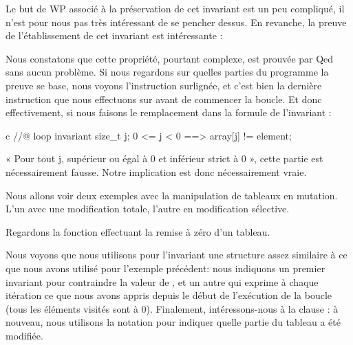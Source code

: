 Le but de WP associé à la préservation de cet invariant est un peu compliqué, il
n'est pour nous pas très intéressant de se pencher dessus. En revanche, la
preuve de l'établissement de cet invariant est intéressante :





Nous constatons que cette propriété, pourtant complexe, est prouvée par
Qed sans aucun problème. Si nous regardons sur quelles parties du programme la
preuve se base, nous voyons l'instruction  surlignée, et c'est
bien la dernière instruction que nous effectuons sur  avant de commencer
la boucle. Et donc effectivement, si nous faisons le remplacement dans la formule
de l'invariant :



\begin{CodeBlock}{c}
//@ loop invariant \forall size_t j; 0 <= j < 0 ==> array[j] != element;
\end{CodeBlock}



« Pour tout j, supérieur ou égal à 0 et inférieur strict à 0 », cette partie est
nécessairement fausse. Notre implication est donc nécessairement vraie.





Nous allons voir deux exemples avec la manipulation de tableaux en mutation.
L'un avec une modification totale, l'autre en modification sélective.





Regardons la fonction effectuant la remise à zéro d'un tableau.






Nous voyons que nous utilisons pour l'invariant une structure assez similaire
à ce que nous avons utilisé pour l'exemple précédent: nous indiquons un premier
invariant pour contraindre la valeur de , et un autre qui exprime
à chaque itération ce que nous avons appris depuis le début de l'exécution de la
boucle (tous les éléments visités sont à $0$). Finalement, intéressons-nous à la
clause : à nouveau, nous utilisons la notation
 pour indiquer quelle partie du tableau a été modifiée.




